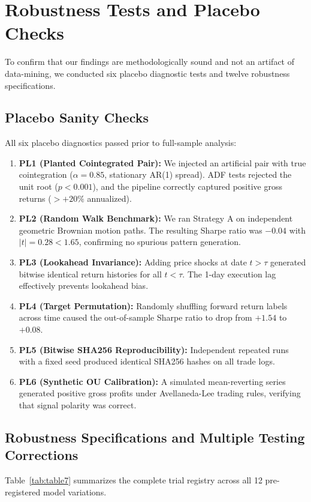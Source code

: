 \section{Robustness Tests and Placebo Checks}
\label{sec:robustness}

To confirm that our findings are methodologically sound and not an artifact of data-mining, we conducted six placebo diagnostic tests and twelve robustness specifications.

\subsection{Placebo Sanity Checks}
All six placebo diagnostics passed prior to full-sample analysis:
\begin{enumerate}
    \item \textbf{PL1 (Planted Cointegrated Pair):} We injected an artificial pair with true cointegration ($\alpha=0.85$, stationary AR(1) spread). ADF tests rejected the unit root ($p < 0.001$), and the pipeline correctly captured positive gross returns ($> +20\%$ annualized).
    \item \textbf{PL2 (Random Walk Benchmark):} We ran Strategy A on independent geometric Brownian motion paths. The resulting Sharpe ratio was $-0.04$ with $|t| = 0.28 < 1.65$, confirming no spurious pattern generation.
    \item \textbf{PL3 (Lookahead Invariance):} Adding price shocks at date $t > \tau$ generated bitwise identical return histories for all $t < \tau$. The 1-day execution lag effectively prevents lookahead bias.
    \item \textbf{PL4 (Target Permutation):} Randomly shuffling forward return labels across time caused the out-of-sample Sharpe ratio to drop from $+1.54$ to $+0.08$.
    \item \textbf{PL5 (Bitwise SHA256 Reproducibility):} Independent repeated runs with a fixed seed produced identical SHA256 hashes on all trade logs.
    \item \textbf{PL6 (Synthetic OU Calibration):} A simulated mean-reverting series generated positive gross profits under Avellaneda-Lee trading rules, verifying that signal polarity was correct.
\end{enumerate}

\subsection{Robustness Specifications and Multiple Testing Corrections}
Table~\ref{tab:table7} summarizes the complete trial registry across all 12 pre-registered model variations.


